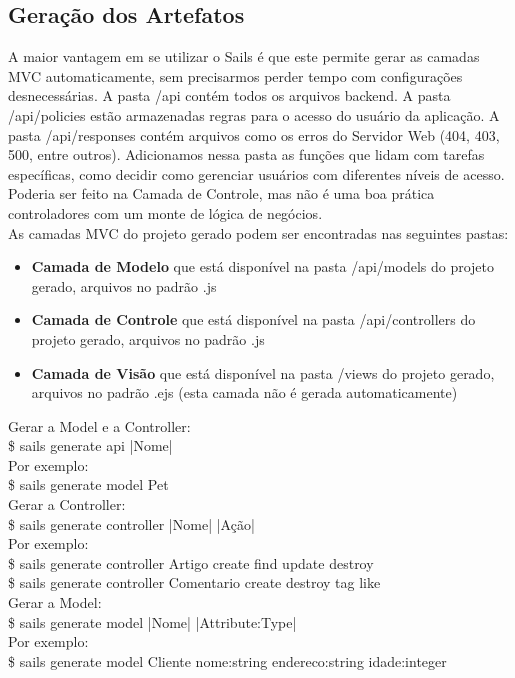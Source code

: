 \documentclass[a4paper,11pt]{article}
\begin{document}
\subsection{Geração dos Artefatos}
A maior vantagem em se utilizar o Sails é que este permite gerar as camadas MVC automaticamente, sem precisarmos perder tempo com configurações desnecessárias. A pasta /api contém todos os arquivos backend. A pasta /api/policies estão armazenadas regras para o acesso do usuário da aplicação. A pasta /api/responses contém arquivos como os erros do Servidor Web (404, 403, 500, entre outros). Adicionamos nessa pasta as funções que lidam com tarefas específicas, como decidir como gerenciar usuários com diferentes níveis de acesso. Poderia ser feito na Camada de Controle, mas não é uma boa prática controladores com um monte de lógica de negócios. \\[3mm]
As camadas MVC do projeto gerado podem ser encontradas nas seguintes pastas:
\begin{itemize}
  \item \textbf{Camada de Modelo} que está disponível na pasta /api/models do projeto gerado, arquivos no padrão .js
  \item \textbf{Camada de Controle} que está disponível na pasta /api/controllers do projeto gerado, arquivos no padrão .js
  \item \textbf{Camada de Visão} que está disponível na pasta /views do projeto gerado, arquivos no padrão .ejs 
  (esta camada não é gerada automaticamente)
\end{itemize}
Gerar a Model e a Controller: \\[1mm]
{\ttfamily\$ sails generate api |Nome|} \\[3mm]
Por exemplo: \\[1mm]
{\ttfamily\$ sails generate model Pet} \\[3mm]
Gerar a Controller: \\[1mm]
{\ttfamily\$ sails generate controller |Nome| |Ação|} \\[3mm]
Por exemplo: \\[1mm]
{\ttfamily\$ sails generate controller Artigo create find update destroy} \\[1mm]
{\ttfamily\$ sails generate controller Comentario create destroy tag like} \\[3mm]
Gerar a Model: \\[1mm]
{\ttfamily\$ sails generate model |Nome| |Attribute:Type|} \\[3mm]
Por exemplo: \\[1mm]
{\ttfamily\$ sails generate model Cliente nome:string endereco:string idade:integer}
\end{document}

